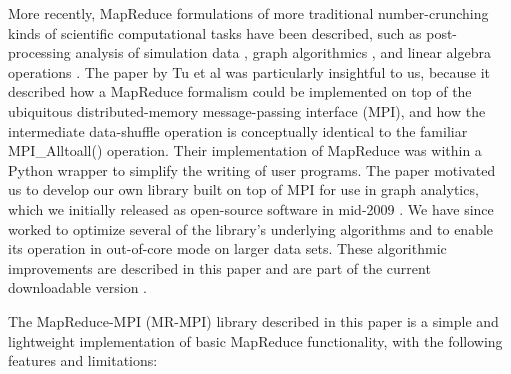 More recently, MapReduce formulations of more traditional
number-crunching kinds of scientific computational tasks have been
described, such as post-processing analysis of simulation data
\cite{Tu}, graph algorithmics \cite{Cohen}, and linear algebra
operations \cite{Fox}.  The paper by Tu et al \cite{Tu} was
particularly insightful to us, because it described how a MapReduce
formalism could be implemented on top of the ubiquitous
distributed-memory message-passing interface (MPI), and how the
intermediate data-shuffle operation is conceptually identical to the
familiar MPI_Alltoall() operation.  Their implementation of MapReduce
was within a Python wrapper to simplify the writing of user programs.
The paper motivated us to develop our own library built on top of MPI
for use in graph analytics, which we initially released as open-source
software in mid-2009 \cite{MRMPI}.  We have since worked to optimize
several of the library's underlying algorithms and to enable its
operation in out-of-core mode on larger data sets.  These algorithmic
improvements are described in this paper and are part of the current
downloadable version \cite{MRMPI}.

The MapReduce-MPI (MR-MPI) library described in this paper is a simple
and lightweight implementation of basic MapReduce functionality, with
the following features and limitations:

